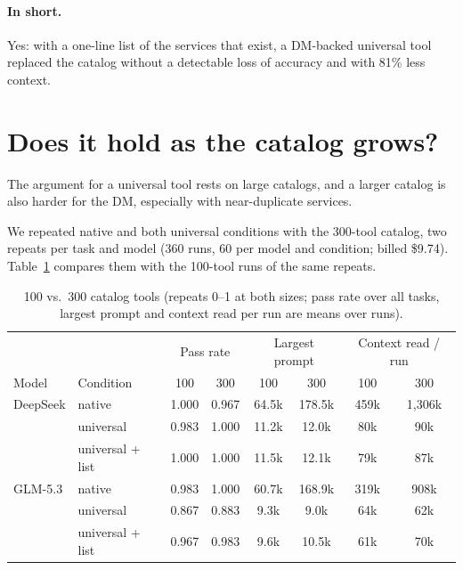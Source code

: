 \paragraph{In short.} Yes: with a one-line list of the services that exist, a DM-backed universal tool replaced
the catalog without a detectable loss of accuracy and with 81\% less context.

\section{Does it hold as the catalog grows?}\label{sec:scale}
The argument for a universal tool rests on large catalogs, and a larger catalog is
also harder for the DM, especially with near-duplicate services.

We repeated native and both universal conditions with the 300-tool catalog, two repeats per task and model
(360 runs, 60 per model and condition; billed \$9.74).
Table~\ref{tab:sweep} compares them with the 100-tool runs of the same repeats.

\begin{table}[t]
\centering\small
\caption{100 vs.\ 300 catalog tools (repeats 0--1 at both sizes; pass rate over all tasks, largest prompt and
context read per run are means over runs).}
\label{tab:sweep}
\setlength{\tabcolsep}{4pt}
\begin{tabular}{@{}llcccccc@{}}
\toprule
& & \multicolumn{2}{c}{Pass rate} & \multicolumn{2}{c}{Largest prompt} & \multicolumn{2}{c}{Context read / run} \\
Model & Condition & 100 & 300 & 100 & 300 & 100 & 300 \\
\midrule
DeepSeek & native & 1.000 & 0.967 & 64.5k & 178.5k & 459k & 1{,}306k \\
 & universal & 0.983 & 1.000 & 11.2k & 12.0k & 80k & 90k \\
 & universal + list & 1.000 & 1.000 & 11.5k & 12.1k & 79k & 87k \\
GLM-5.3 & native & 0.983 & 1.000 & 60.7k & 168.9k & 319k & 908k \\
 & universal & 0.867 & 0.883 & 9.3k & 9.0k & 64k & 62k \\
 & universal + list & 0.967 & 0.983 & 9.6k & 10.5k & 61k & 70k \\
\bottomrule
\end{tabular}
\end{table}

